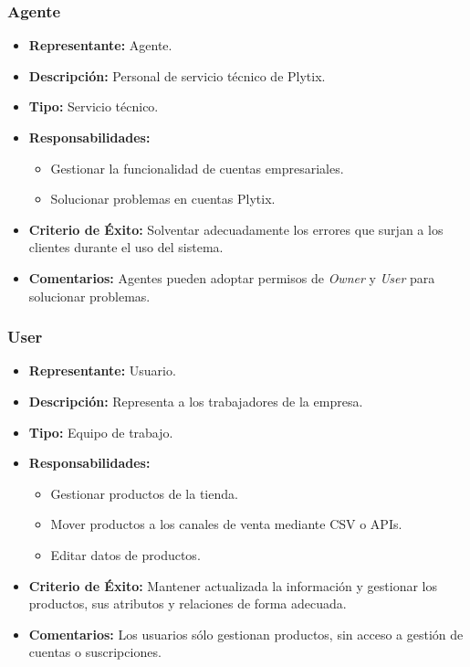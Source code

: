 \documentclass[12pt.a4paper]{article}
\begin{document}
\subsubsection{Agente}

\begin{itemize}
    \item \textbf{Representante:} Agente.
    \item \textbf{Descripción:} Personal de servicio técnico de Plytix.
    \item \textbf{Tipo:} Servicio técnico.
    \item \textbf{Responsabilidades:}
    \begin{itemize}
        \item Gestionar la funcionalidad de cuentas empresariales.
        \item Solucionar problemas en cuentas Plytix.
    \end{itemize}
    \item \textbf{Criterio de Éxito:} Solventar adecuadamente los errores que surjan a los clientes durante el uso del sistema.
    \item \textbf{Comentarios:} Agentes pueden adoptar permisos de \textit{Owner} y \textit{User} para solucionar problemas.
\end{itemize}

\subsubsection{User}

\begin{itemize}
    \item \textbf{Representante:} Usuario.
    \item \textbf{Descripción:} Representa a los trabajadores de la empresa.
    \item \textbf{Tipo:} Equipo de trabajo.
    \item \textbf{Responsabilidades:}
    \begin{itemize}
        \item Gestionar productos de la tienda.
        \item Mover productos a los canales de venta mediante CSV o APIs.
        \item Editar datos de productos.
    \end{itemize}
    \item \textbf{Criterio de Éxito:} Mantener actualizada la información y gestionar los productos, sus atributos y relaciones de forma adecuada.
    \item \textbf{Comentarios:} Los usuarios sólo gestionan productos, sin acceso a gestión de cuentas o suscripciones.
\end{itemize}
\end{document}

